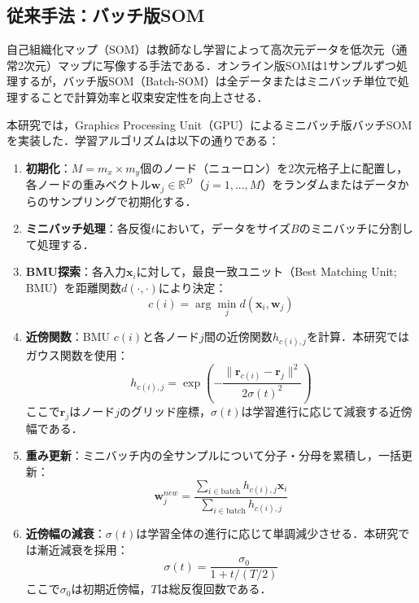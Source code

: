 \documentclass{jarticle}
\theoremstyle{definition}
\begin{document}
\subsection{従来手法：バッチ版SOM}
自己組織化マップ（SOM）\cite{kohonen1990self}は教師なし学習によって高次元データを低次元（通常2次元）マップに写像する手法である．オンライン版SOMは1サンプルずつ処理するが，バッチ版SOM（Batch-SOM）は全データまたはミニバッチ単位で処理することで計算効率と収束安定性を向上させる．

本研究では，Graphics Processing Unit（GPU）によるミニバッチ版バッチSOMを実装した\cite{vettigliminisom}．学習アルゴリズムは以下の通りである：

\begin{enumerate}
\item \textbf{初期化}：$M = m_x \times m_y$個のノード（ニューロン）を2次元格子上に配置し，各ノードの重みベクトル$\bm{w}_j \in \mathbb{R}^D$（$j=1,...,M$）をランダムまたはデータからのサンプリングで初期化する．
\item \textbf{ミニバッチ処理}：各反復$t$において，データをサイズ$B$のミニバッチに分割して処理する．
\item \textbf{BMU探索}：各入力$\bm{x}_i$に対して，最良一致ユニット（Best Matching Unit; BMU）を距離関数$d(\cdot, \cdot)$により決定：
\begin{equation}
c(i) = \arg\min_{j} d(\bm{x}_i, \bm{w}_j)
\end{equation}
\item \textbf{近傍関数}：BMU $c(i)$と各ノード$j$間の近傍関数$h_{c(i),j}$を計算．本研究ではガウス関数を使用：
\begin{equation}
h_{c(i),j} = \exp\left(-\frac{\|\bm{r}_{c(i)} - \bm{r}_j\|^2}{2\sigma(t)^2}\right)
\end{equation}
ここで$\bm{r}_j$はノード$j$のグリッド座標，$\sigma(t)$は学習進行に応じて減衰する近傍幅である．
\item \textbf{重み更新}：ミニバッチ内の全サンプルについて分子・分母を累積し，一括更新：
\begin{equation}
\bm{w}_j^{new} = \frac{\sum_{i \in \text{batch}} h_{c(i),j} \bm{x}_i}{\sum_{i \in \text{batch}} h_{c(i),j}}
\end{equation}
\item \textbf{近傍幅の減衰}：$\sigma(t)$は学習全体の進行に応じて単調減少させる．本研究では漸近減衰を採用：
\begin{equation}
\sigma(t) = \frac{\sigma_0}{1 + t/(T/2)}
\end{equation}
ここで$\sigma_0$は初期近傍幅，$T$は総反復回数である．
\end{enumerate}
\end{document}
